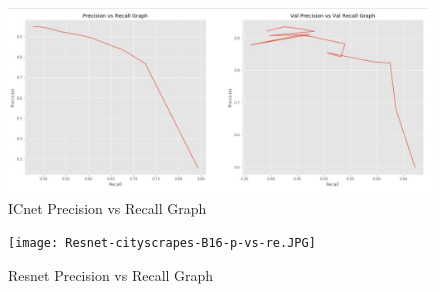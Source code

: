 \documentclass{article}
\begin{document}
\begin{itemize}
\begin{figure}[h]
    \centering
    \captionsetup{justification=centering}
    \includegraphics[width=15cm]{ICnet-cityscrapes-B16-p-vs-re.JPG}
    \caption{ICnet Precision vs Recall Graph}
    \label{fig:Binary class segmented output}
\end{figure}

\begin{figure}[h]
    \centering
    \captionsetup{justification=centering}
    \texttt{[image: Resnet-cityscrapes-B16-p-vs-re.JPG]}
    \caption{Resnet Precision vs Recall Graph}
    \label{fig:Binary class segmented output}
\end{figure}
\end{itemize}
\newpage
\end{document}
